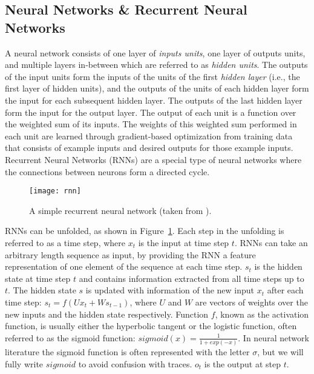 \documentclass[runningheads,a4paper]{llncs}
\begin{document}
\subsection{Neural Networks \& Recurrent Neural Networks}
A neural network consists of one layer of \emph{inputs units}, one layer of outputs units, and multiple layers in-between which are referred to as \emph{hidden units}. The outputs of the input units form the inputs of the units of the first \emph{hidden layer} (i.e., the first layer of hidden units), and the outputs of the units of each hidden layer form the input for each subsequent hidden layer. The outputs of the last hidden layer form the input for the output layer. The output of each unit is a function over the weighted sum of its inputs. The weights of this weighted sum performed in each unit are learned through gradient-based optimization from training data that consists of example inputs and desired outputs for those example inputs. Recurrent Neural Networks (RNNs) are a special type of neural networks where the connections between neurons form a directed cycle.

\begin{figure}[t]\centering
	\texttt{[image: rnn]}
	\caption{A simple recurrent neural network (taken from \cite{LeCun2015}).}
	\label{fig:RNNexample}
\end{figure}


RNNs can be unfolded, as shown in Figure~\ref{fig:RNNexample}. Each step in the unfolding is referred to as a time step, where $x_t$ is the input at time step $t$. RNNs can take an arbitrary length sequence as input, by providing the RNN a feature representation of one element of the sequence at each time step. $s_t$ is the hidden state at time step $t$ and contains information extracted from all time steps up to $t$. The hidden state $s$ is updated with information of the new input $x_t$ after each time step: $s_t = f(Ux_t+Ws_{t-1})$, where $U$ and $W$ are vectors of weights over the new inputs and the hidden state respectively. Function $f$, known as the activation function, is usually either the hyperbolic tangent or the logistic function, often referred to as the sigmoid function: $\mathit{sigmoid}(x)=\frac{1}{1+\mathit{exp}(-x)}$. In neural network literature the sigmoid function is often represented with the letter $\sigma$, but we will fully write $\mathit{sigmoid}$ to avoid confusion with traces. $o_t$ is the output at step $t$.
\end{document}
